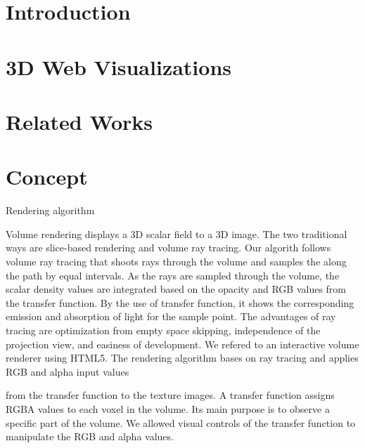 \documentclass{acm_proc_article-sp}
\begin{document}
\maketitle
\begin{abstract}
\end{abstract}


\section{Introduction}


\section{3D Web Visualizations}

\section{Related Works}

\section{Concept}
Rendering algorithm

Volume rendering displays a 3D scalar field to a 3D image. The two traditional ways are slice-based rendering and volume ray tracing. Our algorith follows volume ray tracing that shoots rays through the volume and samples the along the path by equal intervals. As the rays are sampled through the volume, the scalar density values are integrated based on the opacity and RGB values from the transfer function. By the use of transfer function, it shows the corresponding emission and absorption of light for the sample point. The advantages of ray tracing are optimization from empty space skipping, independence of the projection view, and easiness of development.
We refered to an interactive volume renderer using HTML5. The rendering algorithm bases on ray tracing and applies RGB and alpha input values 

from the transfer function to the texture images. A transfer function assigns RGBA values to each voxel in the volume. Its main purpose is to observe a specific part of the volume. We allowed visual controls of the transfer function to manipulate the RGB and alpha values. 
\end{document}
